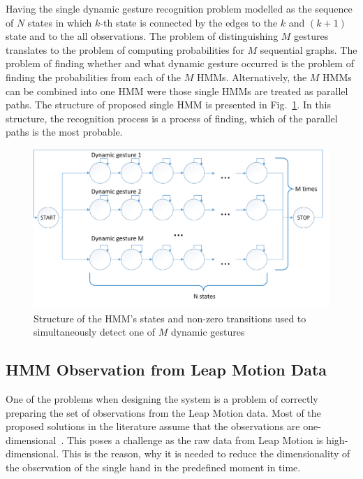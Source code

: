 Having the single dynamic gesture recognition problem modelled as the sequence of $N$ states in which $k$-th state is connected by the edges to the $k$ and $(k+1)$ state and to the all observations.
The problem of distinguishing $M$ gestures translates to the problem of computing probabilities for $M$ sequential graphs.
The problem of finding whether and what dynamic gesture occurred is the problem of finding the probabilities from each of the $M$ HMMs.
Alternatively, the $M$ HMMs can be combined into one HMM were those single HMMs are treated as parallel paths.
The structure of proposed single HMM is presented in Fig.~\ref{HMMstructure}.
In this structure, the recognition process is a process of finding, which of the parallel paths is the most probable.

\begin{figure}[htbp!]
\centering
 \includegraphics[width=1\columnwidth]{figures/HMM_eng.jpg}
 \caption{Structure of the HMM's states and non-zero transitions used to simultaneously detect one of $M$ dynamic gestures}
 \label{HMMstructure}
\end{figure}

\subsection{HMM Observation from Leap Motion Data}

One of the problems when designing the system is a problem of correctly preparing the set of observations from the Leap Motion data.
Most of the proposed solutions in the literature assume that the observations are one-dimensional~\cite{hmmtutorial, hmm}.
This poses a challenge as the raw data from Leap Motion is high-dimensional.
This is the reason, why it is needed to reduce the dimensionality of the observation of the single hand in the predefined moment in time.


